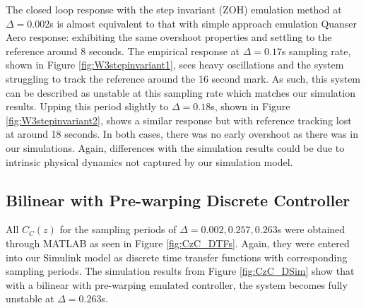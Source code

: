 \documentclass[11pt]{article}
\begin{document}
The closed loop response with the step invariant (ZOH) emulation method at $\Delta = 0.002$s is almost equivalent to that with simple approach emulation Quanser Aero response: exhibiting the same overshoot properties and settling to the reference around $8$ seconds. The empirical response at $\Delta = 0.17$s sampling rate, shown in Figure \ref{fig:W3stepinvariant1}, sees heavy oscillations and the system struggling to track the reference around the 16 second mark. As such, this system can be described as unstable at this sampling rate which matches our simulation results. Upping this period slightly to $\Delta = 0.18$s, shown in Figure \ref{fig:W3stepinvariant2}, shows a similar response but with reference tracking lost at around 18 seconds. In both cases, there was no early overshoot as there was in our simulations. Again, differences with the simulation results could be due to intrinsic physical dynamics not captured by our simulation model.

\subsection{Bilinear with Pre-warping Discrete Controller}
All $C_C(z)$ for the sampling periods of $\Delta = 0.002, 0.257, 0.263$s were obtained through MATLAB as seen in Figure \ref{fig:CzC_DTFs}. Again, they were entered into our Simulink model as discrete time transfer functions with corresponding sampling periods. The simulation results from Figure \ref{fig:CzC_DSim} show that with a bilinear with pre-warping emulated controller, the system becomes fully unstable at $\Delta = 0.263$s.
\end{document}
